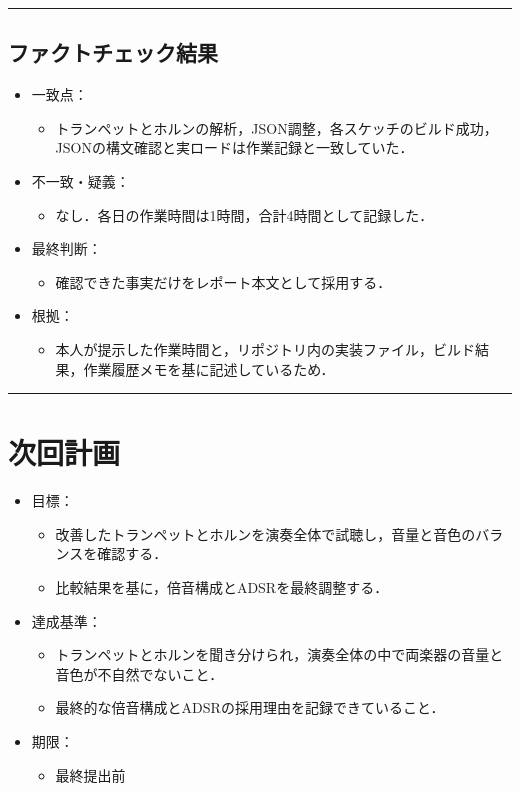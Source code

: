 \documentclass[uplatex,dvipdfmx,a4paper,11pt]{jsarticle}
\newcommand{\sectionrule}{\par\medskip\noindent\rule{\linewidth}{0.6pt}\par\medskip}
\begin{document}
\sectionrule

\subsection{ファクトチェック結果}

\begin{itemize}
  \item 一致点：
    \begin{itemize}
      \item トランペットとホルンの解析，JSON調整，各スケッチのビルド成功，JSONの構文確認と実ロードは作業記録と一致していた．
    \end{itemize}
  \item 不一致・疑義：
    \begin{itemize}
      \item なし．各日の作業時間は1時間，合計4時間として記録した．
    \end{itemize}
  \item 最終判断：
    \begin{itemize}
      \item 確認できた事実だけをレポート本文として採用する．
    \end{itemize}
  \item 根拠：
    \begin{itemize}
      \item 本人が提示した作業時間と，リポジトリ内の実装ファイル，ビルド結果，作業履歴メモを基に記述しているため．
    \end{itemize}
\end{itemize}

\sectionrule

\section{次回計画}

\begin{itemize}
  \item 目標：
    \begin{itemize}
      \item 改善したトランペットとホルンを演奏全体で試聴し，音量と音色のバランスを確認する．
      \item 比較結果を基に，倍音構成とADSRを最終調整する．
    \end{itemize}
  \item 達成基準：
    \begin{itemize}
      \item トランペットとホルンを聞き分けられ，演奏全体の中で両楽器の音量と音色が不自然でないこと．
      \item 最終的な倍音構成とADSRの採用理由を記録できていること．
    \end{itemize}
  \item 期限：
    \begin{itemize}
      \item 最終提出前
    \end{itemize}
\end{itemize}
\end{document}
